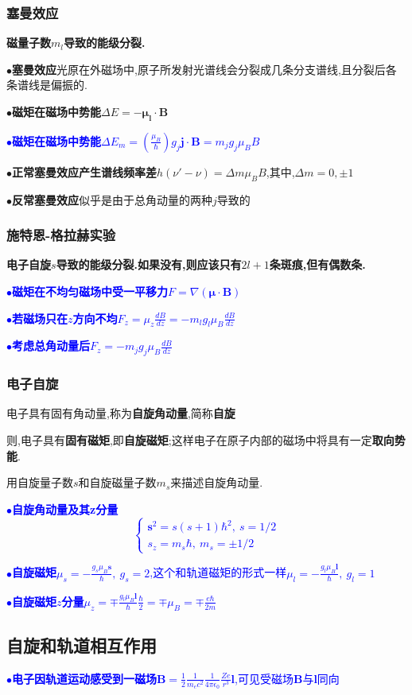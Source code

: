 \documentclass[UTF8]{article}
\newcommand{\keypoint}[2]{$\bullet$\textbf{#1}\quad#2\par}
\begin{document}
\subsubsection{塞曼效应}
\textbf{磁量子数$m_l$导致的能级分裂.}\par
\keypoint{塞曼效应}{光原在外磁场中,原子所发射光谱线会分裂成几条分支谱线,且分裂后各条谱线是偏振的.}
\keypoint{磁矩在磁场中势能}{$\Delta E=-\bm{\mu_l\cdot B}$}
\textcolor{blue}{\keypoint{磁矩在磁场中势能}{$\Delta E_m=\left(\frac{\mu_B}{\hbar}\right)g_j\bm{j\cdot B}=m_jg_j\mu_BB$}}
\keypoint{正常塞曼效应产生谱线频率差}{$h(\nu'-\nu)=\Delta m\mu_B B$,其中,$\Delta m=0,\pm1$}
\keypoint{反常塞曼效应}{似乎是由于总角动量的两种$j$导致的}
\subsubsection{施特恩-格拉赫实验}
\textbf{电子自旋$s$导致的能级分裂.如果没有,则应该只有$2l+1$条斑痕,但有偶数条.}\par
\textcolor{blue}{\keypoint{磁矩在不均匀磁场中受一平移力}{$F=\nabla (\bm{\mu\cdot B})$}
\keypoint{若磁场只在$z$方向不均}{$F_z=\mu_z\frac{dB}{dz}=-m_lg_l\mu_B\frac{dB}{dz}$}
\keypoint{考虑总角动量后}{$F_z=-m_jg_j\mu_B\frac{dB}{dz}$}}
\subsubsection{电子自旋}
电子具有固有角动量,称为\textbf{自旋角动量},简称\textbf{自旋}\par
则,电子具有\textbf{固有磁矩},即\textbf{自旋磁矩};这样电子在原子内部的磁场中将具有一定\textbf{取向势能}.\par
用自旋量子数$s$和自旋磁量子数$m_s$来描述自旋角动量.\par
\textcolor{blue}{\keypoint{自旋角动量及其z分量}{
	$$ \left\{
	\begin{array}{l}
	\bm{s}^2=s(s+1)\hbar^2,\ s=1/2\\
	s_z=m_s\hbar,\ m_s=\pm1/2
	\end{array}
	\right .$$
}}
\textcolor{blue}{\keypoint{自旋磁矩}{$\mu_s=-\frac{g_s\mu_B\bm{s}}{\hbar},\ g_s=2$,这个和轨道磁矩的形式一样$\mu_l=-\frac{g_l\mu_B\bm{l}}{\hbar},\ g_l=1$}
\keypoint{自旋磁矩$z$分量}{$\mu_z=\mp\frac{g_l\mu_B\bm{l}}{\hbar}\frac{\hbar}{2}=\mp\mu_B=\mp\frac{e\hbar}{2m}$}}
\subsection{自旋和轨道相互作用}
\textcolor{blue}{\keypoint{电子因轨道运动感受到一磁场}{$\bm{B}=\frac{1}{2}\frac{1}{m_ec^2}\frac{1}{4\pi\epsilon_{0}}\frac{Ze}{r^3}\bm{l}$,可见受磁场$\bm{B}$与$\bm{l}$同向}}
\end{document}
